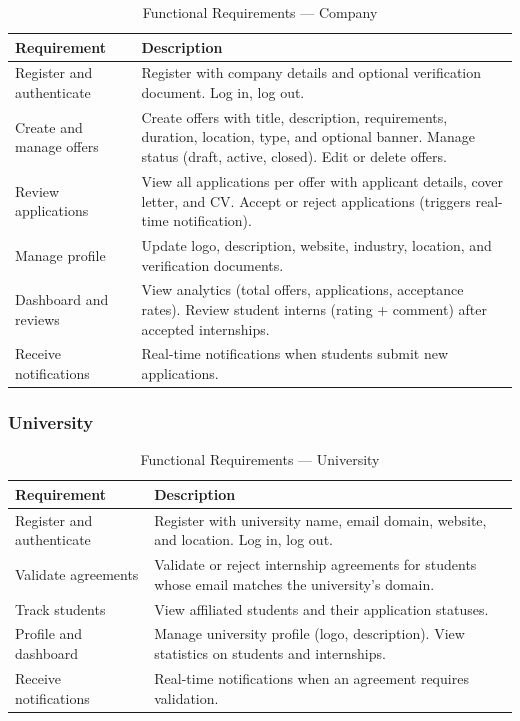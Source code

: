 \begin{table}[H]
\centering
\caption{Functional Requirements --- Company}
\label{tab:fr-company}
\begin{tabular}{|p{4cm}|p{10cm}|}
\hline
\textbf{Requirement} & \textbf{Description} \\
\hline
Register and authenticate & Register with company details and optional verification document. Log in, log out. \\
\hline
Create and manage offers & Create offers with title, description, requirements, duration, location, type, and optional banner. Manage status (draft, active, closed). Edit or delete offers. \\
\hline
Review applications & View all applications per offer with applicant details, cover letter, and CV. Accept or reject applications (triggers real-time notification). \\
\hline
Manage profile & Update logo, description, website, industry, location, and verification documents. \\
\hline
Dashboard and reviews & View analytics (total offers, applications, acceptance rates). Review student interns (rating + comment) after accepted internships. \\
\hline
Receive notifications & Real-time notifications when students submit new applications. \\
\hline
\end{tabular}
\end{table}

\subsubsection{University}

\begin{table}[H]
\centering
\caption{Functional Requirements --- University}
\label{tab:fr-university}
\begin{tabular}{|p{4cm}|p{10cm}|}
\hline
\textbf{Requirement} & \textbf{Description} \\
\hline
Register and authenticate & Register with university name, email domain, website, and location. Log in, log out. \\
\hline
Validate agreements & Validate or reject internship agreements for students whose email matches the university's domain. \\
\hline
Track students & View affiliated students and their application statuses. \\
\hline
Profile and dashboard & Manage university profile (logo, description). View statistics on students and internships. \\
\hline
Receive notifications & Real-time notifications when an agreement requires validation. \\
\hline
\end{tabular}
\end{table}

